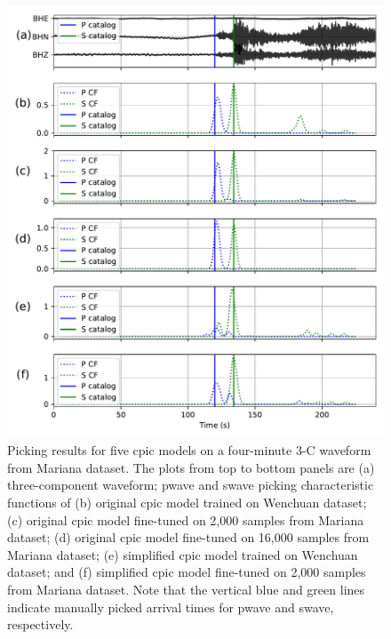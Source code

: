 \documentclass{article}
\begin{document}
\begin{figure}
    \centering
    \includegraphics[width=\columnwidth]{rbp}
    \caption{Picking results for five \gls{cpic} models on a four-minute 3-C waveform from Mariana dataset. The plots from top to bottom panels are (a) three-component waveform; \gls{pwave} and \gls{swave} picking characteristic functions of (b) original \gls{cpic} model trained on Wenchuan dataset; (c) original \gls{cpic} model fine-tuned on 2,000 samples from Mariana dataset; (d) original \gls{cpic} model fine-tuned on 16,000 samples from Mariana dataset; (e) simplified \gls{cpic} model trained on Wenchuan dataset; and (f) simplified \gls{cpic} model fine-tuned on 2,000 samples from Mariana dataset. Note that the vertical blue and green lines indicate manually picked arrival times for \gls{pwave} and \gls{swave}, respectively.}
    \label{fig:rbp}
\end{figure}
%
\end{document}

